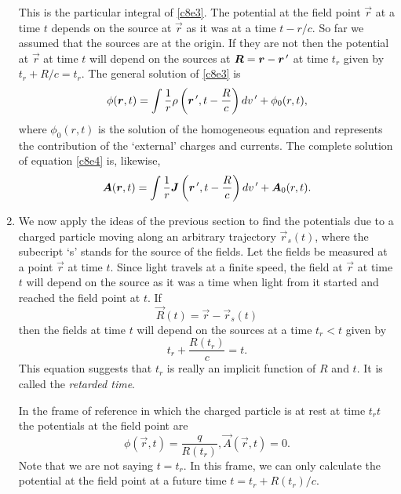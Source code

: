 \begin{enumerate}
\begin{equation}
\end{equation}
This is the particular integral of \eqref{c8e3}. The potential at the field 
point $\vec{r}$ at a time $t$ depends on the source at $\vec{r}$ as it was at 
a time $t - r/c$. So far we assumed that the sources are at the origin. If they
are not then the potential at $\vec{r}$ at time $t$ will depend on the sources
at $\bm{R} = \bm{r} - \bm{r}^{\,\prime}$ at time $t_r$ given by $t_r + R/c = t_r$. 
The general solution of \eqref{c8e3} is
\begin{equation}\label{c8e13}
\phi(\bm{r}, t) = 
\int\frac{1}{r}\rho\left(\bm{r}^{\,\prime}, t - \frac{R}{c}\right)dv^{\,\prime}
 + \phi_0(r, t),
\end{equation}
where $\phi_0(r, t)$ is the solution of the homogeneous equation and represents
the contribution of the `external' charges and currents. The complete solution 
of equation \eqref{c8e4} is, likewise,
\begin{equation}\label{c8e14}
\bm{A}(\bm{r}, t) = 
\int\frac{1}{r}\bm{J}\left(\bm{r}^{\,\prime}, t - \frac{R}{c}\right)dv^{\,\prime}
 + \bm{A}_0(r, t).
\end{equation}

\item We now apply the ideas of the previous section to find the potentials
due to a charged particle moving along an arbitrary trajectory $\vec{r}_s(t)$,
where the subecript `s' stands for the source of the fields. Let the fields be
measured at a point $\vec{r}$ at time $t$. Since light travels at a finite 
speed, the field at $\vec{r}$ at time $t$ will depend on the source as it was
a time when light from it started and reached the field point at $t$. If 
\begin{equation}\label{c8e15}
\vec{R}(t) = \vec{r} - \vec{r}_s(t)
\end{equation}
then the fields at time $t$ will depend on the sources at a time $t_r < t$ 
given by
\begin{equation}\label{c8e16}
t_r + \frac{R(t_r)}{c} = t.
\end{equation}
This equation suggests that $t_r$ is really an implicit function of $R$ and $t$.
It is called the \emph{retarded time}.

In the frame of reference in which the charged particle is at rest at time
$t_rt$ the potentials at the field point are
\begin{equation}\label{c8e17}
\phi(\vec{r}, t) = \frac{q}{R(t_r)}, \vec{A}(\vec{r}, t) = 0.
\end{equation}
Note that we are not saying $t = t_r$. In this frame, we can only calculate the
potential at the field point at a future time $t = t_r + R(t_r)/c$.


\end{enumerate}
